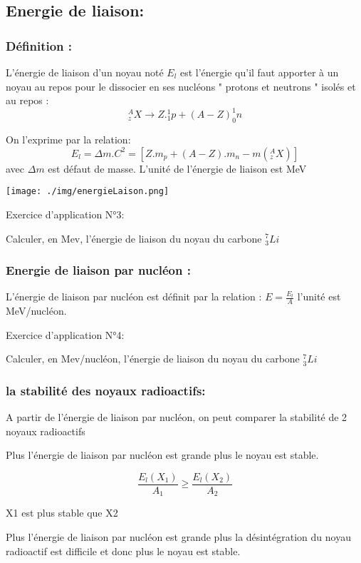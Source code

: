 \documentclass[12pt]{article}
\begin{document}
\subsection{Energie de liaison:}
\subsubsection{ Définition :}
L'énergie de liaison d'un noyau noté $E_l$ est l'énergie qu'il faut apporter à un noyau au
repos pour le dissocier en ses nucléons " protons et neutrons " isolés et au repos :
$$_z^AX \rightarrow Z._1^1p + (A-Z)_0^1n$$

On l'exprime par la relation: $$E_l = \Delta{m}.C^2 = [Z.m_p + (A-Z).m_n - m(_z^AX)]$$
avec $\Delta{m}$ est défaut de masse. L'unité de l'énergie de liaison est MeV
\begin{center}
	\texttt{[image: ./img/energieLaison.png]}
\end{center}
\begin{tcolorbox}
	Exercice d’application N°3:

	Calculer, en Mev, l’énergie de liaison du noyau du carbone $^7_3Li$
\end{tcolorbox}

\subsubsection{Energie de liaison par nucléon : }
L'énergie de liaison par nucléon est définit par la relation : $E = \frac{E_l}{A}$
l'unité est MeV/nucléon.
\begin{tcolorbox}
	Exercice d’application N°4:

	Calculer, en Mev/nucléon, l’énergie de liaison du noyau du carbone $^7_3Li$
\end{tcolorbox}

\subsubsection{la stabilité des noyaux radioactifs: }
A partir de l’énergie de liaison par nucléon, on peut comparer la stabilité de 2
noyaux radioactifs

Plus l'énergie de liaison par nucléon est grande plus le noyau est stable.

$$\frac{E_l(X_1)}{A_1} \geq \frac{E_l(X_2)}{A_2}$$

X1 est plus stable que X2

Plus l'énergie de liaison par nucléon est grande plus la désintégration
du noyau radioactif est difficile et donc plus le noyau est stable.
\end{document}

